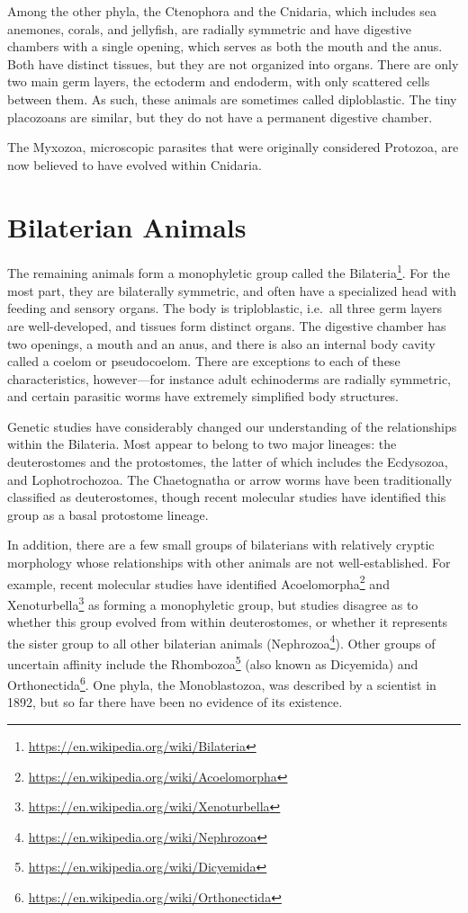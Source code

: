 \documentclass[]{book}
\let\rmarkdownfootnote\footnote%
\def\footnote{\protect\rmarkdownfootnote}
\renewcommand{\href}[2]{#2\footnote{\url{#1}}}
\theoremstyle{definition}
\theoremstyle{definition}
\theoremstyle{definition}
\theoremstyle{remark}
\begin{document}
Among the other phyla, the Ctenophora and the Cnidaria, which includes
sea anemones, corals, and jellyfish, are radially symmetric and have
digestive chambers with a single opening, which serves as both the mouth
and the anus. Both have distinct tissues, but they are not organized
into organs. There are only two main germ layers, the ectoderm and
endoderm, with only scattered cells between them. As such, these animals
are sometimes called diploblastic. The tiny placozoans are similar, but
they do not have a permanent digestive chamber.

The Myxozoa, microscopic parasites that were originally considered
Protozoa, are now believed to have evolved within Cnidaria.

\section{Bilaterian Animals}\label{bilaterian-animals}

The remaining animals form a monophyletic group called the \href{https://en.wikipedia.org/wiki/Bilateria}{Bilateria}.
For the most part, they are bilaterally symmetric, and often have a
specialized head with feeding and sensory organs. The body is
triploblastic, i.e.~all three germ layers are well-developed, and
tissues form distinct organs. The digestive chamber has two openings, a
mouth and an anus, and there is also an internal body cavity called a
coelom or pseudocoelom. There are exceptions to each of these
characteristics, however---for instance adult echinoderms are radially
symmetric, and certain parasitic worms have extremely simplified body
structures.

Genetic studies have considerably changed our understanding of the
relationships within the Bilateria. Most appear to belong to two major
lineages: the deuterostomes and the protostomes, the latter of which
includes the Ecdysozoa, and Lophotrochozoa. The Chaetognatha or arrow
worms have been traditionally classified as deuterostomes, though recent
molecular studies have identified this group as a basal protostome
lineage.

In addition, there are a few small groups of bilaterians with relatively
cryptic morphology whose relationships with other animals are not
well-established. For example, recent molecular studies have identified
\href{https://en.wikipedia.org/wiki/Acoelomorpha}{Acoelomorpha} and \href{https://en.wikipedia.org/wiki/Xenoturbella}{Xenoturbella} as forming a monophyletic group, but
studies disagree as to whether this group evolved from within
deuterostomes, or whether it represents the sister group to all other
bilaterian animals (\href{https://en.wikipedia.org/wiki/Nephrozoa}{Nephrozoa}). Other groups of uncertain affinity
include the \href{https://en.wikipedia.org/wiki/Dicyemida}{Rhombozoa} (also known as Dicyemida) and \href{https://en.wikipedia.org/wiki/Orthonectida}{Orthonectida}. One phyla, the Monoblastozoa,
was described by a scientist in 1892, but so far there have been no
evidence of its existence.
\end{document}

